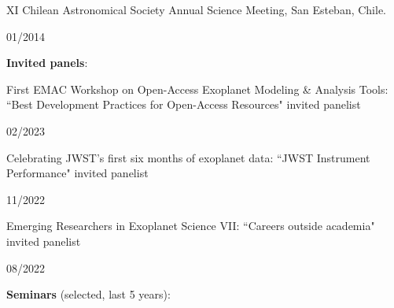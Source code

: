\documentclass[12pt, a4paper]{article} %
\begin{document}
\begin{minipage}[t]{0.7\textwidth}
\begin{flushleft}%
  \setlength{\leftskip}{0.2cm}%
XI Chilean Astronomical Society Annual Science Meeting, San Esteban, Chile.
\end{flushleft}
\end{minipage}
\begin{minipage}[t]{0.3\textwidth}
\hfill 01/2014
\end{minipage}
\vspace{0.2cm}

\textbf{Invited panels}:\\

\begin{minipage}[t]{0.7\textwidth}
\begin{flushleft}%
  \setlength{\leftskip}{0.2cm}%
First EMAC Workshop on Open-Access Exoplanet Modeling \& Analysis Tools: ``Best Development Practices for Open-Access Resources" invited panelist
\end{flushleft}
\end{minipage}
\begin{minipage}[t]{0.3\textwidth}
\hfill 02/2023
\end{minipage}
\vspace{0.2cm}

\begin{minipage}[t]{0.7\textwidth}
\begin{flushleft}%
  \setlength{\leftskip}{0.2cm}%
Celebrating JWST's first six months of exoplanet data: ``JWST Instrument Performance" invited panelist
\end{flushleft}
\end{minipage}
\begin{minipage}[t]{0.3\textwidth}
\hfill 11/2022
\end{minipage}
\vspace{0.2cm}

\begin{minipage}[t]{0.7\textwidth}
\begin{flushleft}%
  \setlength{\leftskip}{0.2cm}%
Emerging Researchers in Exoplanet Science VII: ``Careers outside academia" invited panelist
\end{flushleft}
\end{minipage}
\begin{minipage}[t]{0.3\textwidth}
\hfill 08/2022
\end{minipage}
\vspace{0.2cm}

\textbf{Seminars} (selected, last 5 years):\\
\end{document}
